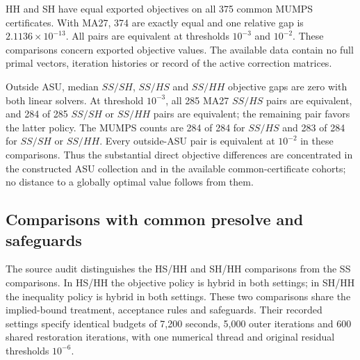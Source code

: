 \documentclass[pdflatex,sn-mathphys-num]{sn-jnl}
\theoremstyle{thmstyleone}
\theoremstyle{thmstylethree}
\begin{document}
HH and SH have equal exported objectives on all 375 common MUMPS
certificates. With MA27, 374 are exactly equal and one relative gap is
$2.1136\times10^{-13}$. All pairs are equivalent at thresholds $10^{-3}$
and $10^{-2}$. These comparisons concern exported objective values. The available data
contain no full primal vectors, iteration histories or record of the active
correction matrices.

Outside ASU, median $SS/SH$, $SS/HS$ and $SS/HH$ objective gaps are zero
with both linear solvers. At threshold $10^{-3}$, all 285 MA27 $SS/HS$
pairs are equivalent, and 284 of 285 $SS/SH$ or $SS/HH$ pairs are
equivalent; the remaining pair favors the latter policy. The MUMPS
counts are 284 of 284 for $SS/HS$ and 283 of 284 for $SS/SH$ or $SS/HH$.
Every outside-ASU pair is equivalent at $10^{-2}$ in these comparisons.
Thus the substantial direct objective differences are concentrated in
the constructed ASU collection and in the available common-certificate
cohorts; no distance to a globally optimal value follows from them.

\subsection{Comparisons with common presolve and safeguards}
The source audit distinguishes the HS/HH and SH/HH comparisons from the
SS comparisons. In HS/HH the objective policy is hybrid in both settings;
in SH/HH the inequality policy is hybrid in both settings. These two
comparisons share the implied-bound treatment, acceptance rules and
safeguards. Their recorded settings specify identical budgets of 7,200
seconds, 5,000 outer iterations and 600 shared restoration iterations,
with one numerical thread and original residual thresholds $10^{-6}$.
\end{document}
